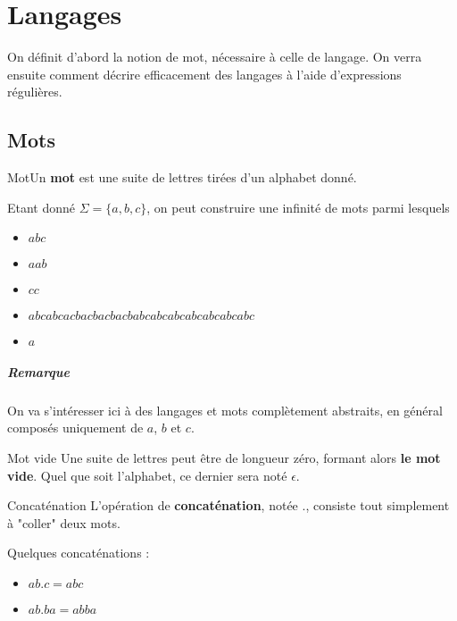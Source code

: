 
\chapter{Langages}
\label{langages}

On définit d'abord la notion de mot, nécessaire à celle de langage. On verra ensuite comment décrire efficacement des langages à l'aide d'expressions régulières.

\section{Mots}

\begin{definition}{Mot}{}Un \textbf{mot} est une suite de lettres tirées d'un alphabet donné.
\end{definition}

\begin{example}
Etant donné $\Sigma = \{a,b,c\}$, on peut construire une infinité de mots parmi lesquels 

\begin{itemize}
    \item $abc$
    \item $aab$
    \item $cc$
    \item $abcabcacbacbacbacbabcabcabcabcabcabcabc$
    \item $a$
\end{itemize}

\end{example}


\paragraph{Remarque} On va s'intéresser ici à des langages et mots complètement abstraits, en général composés uniquement de $a$, $b$ et $c$.

\begin{definition}{Mot vide}{}
Une suite de lettres peut être de longueur zéro, formant alors \textbf{le mot vide}. Quel que soit l'alphabet, ce dernier sera noté $\epsilon$.
\end{definition}

\begin{definition}{Concaténation}{}
\label{concat}
L'opération de \textbf{concaténation}, notée $.$, consiste tout simplement à "coller" deux mots.
\end{definition}

\begin{example}{Quelques concaténations :}

\begin{itemize}
    \item $ab.c = abc$
    \item $ab.ba = abba$
\end{itemize}
\end{example}

